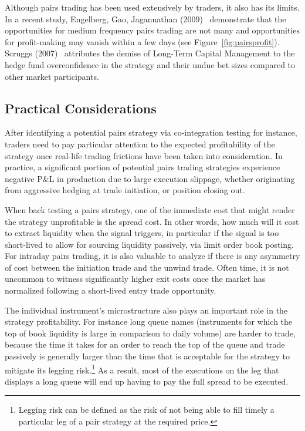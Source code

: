 Although pairs trading has been used extensively by traders, it also has its limits. In a recent study, Engelberg, Gao, Jagannathan (2009)~\cite{engelberg2009anatomy} demonstrate that the opportunities for medium frequency pairs trading are not many and opportunities for profit-making may vanish within a few days (see Figure~\ref{fig:pairsprofit}). Scruggs (2007)~\cite{scruggs} attributes the demise of Long-Term Capital Management to the hedge fund overconfidence in the strategy and their undue bet sizes compared to other market participants.


\subsection{Practical Considerations \label{s:pract_consid}}

After identifying a potential pairs strategy via co-integration testing for instance, traders need to pay particular attention to the expected profitability of the strategy once real-life trading frictions have been taken into consideration. In practice, a significant portion of potential pairs trading strategies experience negative P\&L in production due to large execution slippage, whether originating from aggressive hedging at trade initiation, or position closing out.


When back testing a pairs strategy, one of the immediate cost that might render the strategy unprofitable is the spread cost. In other words, how much will it cost to extract liquidity when the signal triggers, in particular if the signal is too short-lived to allow for sourcing liquidity passively, via limit order book posting. For intraday pairs trading, it is also valuable to analyze if there is any asymmetry of cost between the initiation trade and the unwind trade. Often time, it is not uncommon to witness significantly higher exit costs once the market has normalized following a short-lived entry trade opportunity. 


The individual instrument's microstructure also plays an important role in the strategy profitability. For instance long queue names  (instruments for which the top of book liquidity is large in comparison to daily volume)  are harder to trade, because the time it takes for an order to reach the top of the queue and trade passively is generally larger than the time that is acceptable for the strategy to mitigate its legging risk.\footnote{Legging risk can be defined as the risk of not being able to fill timely a particular leg of a pair strategy at the required price.} As a result, most of the executions on the leg that displays a long queue will end up having to pay the full spread to be executed. 


